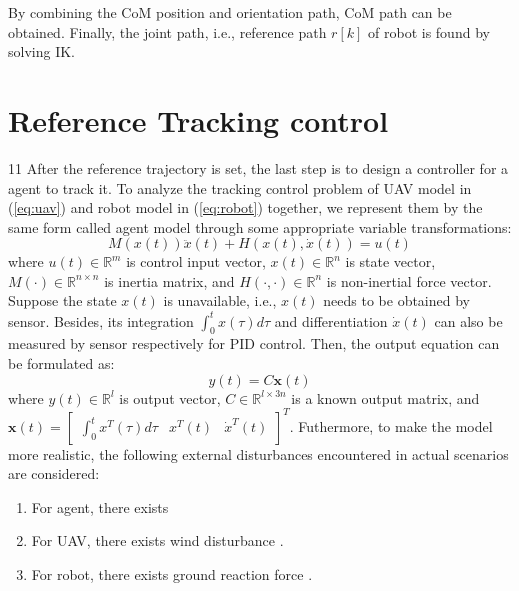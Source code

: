 \documentclass{ieeeaccess}
\begin{document}
By combining the CoM position and orientation path, CoM path can be obtained. Finally, the joint path, i.e., reference path $r[k]$ of robot is found by solving IK.

\section{Reference Tracking control}
11
After the reference trajectory is set, the last step is to design a controller for a agent to track it. To analyze the tracking control problem of UAV model in (\ref{eq:uav}) and robot model in (\ref{eq:robot}) together, we represent them by the same form called agent model through some appropriate variable transformations:
\begin{equation} \label{eq:agent} 
    M(x(t))\ddot{x}(t) + H(x(t),\dot{x}(t)) = u(t)
\end{equation}
where $u(t)\in\mathbb{R}^m$ is control input vector, $x(t)\in\mathbb{R}^n$ is state vector, $M(\cdot)\in\mathbb{R}^{n\times n}$ is inertia matrix, and $H(\cdot, \cdot)\in\mathbb{R}^n$ is non-inertial force vector. Suppose the state $x(t)$ is unavailable, i.e., $x(t)$ needs to be obtained by sensor. Besides, its integration $\int_{0}^{t} x(\tau) d\tau$ and differentiation $\dot{x}(t)$ can also be measured by sensor respectively for PID control. Then, the output equation can be formulated as:
\begin{equation} \label{eq:agent output}
    y(t) = C\pmb{x}(t)
\end{equation}
where $y(t)\in\mathbb{R}^l$ is output vector, $C\in\mathbb{R}^{l\times 3n}$ is a known output matrix, and $\pmb{x}(t)=\begin{bmatrix}
    \int_{0}^{t} x^T(\tau) d\tau & x^T(t) & \dot{x}^T(t)
\end{bmatrix}^T$. Futhermore, to make the model more realistic, the following external disturbances encountered in actual scenarios are considered:
\begin{enumerate}
    \item For agent, there exists
    \item For UAV, there exists wind disturbance \cite{9075385}.
    \item For robot, there exists ground reaction force \cite{chen2013human}. 
\end{enumerate}
\end{document}
